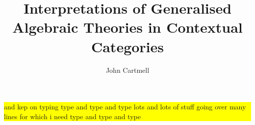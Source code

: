 \documentclass[10pt,a4paper]{article}
\theoremstyle{remark}
\begin{document}
\title{Interpretations of Generalised Algebraic Theories in Contextual Categories}

\author{John Cartmell}

\maketitle

\noindent\colorbox{yellow}{%
    \parbox{\dimexpr\linewidth-2\fboxsep}%
        {%
			and kep on typing 
type and type and type
       lots and lots of stuff going over many lines for which i need type and type and type
        }
    }

\newcommand{\gatU}{\gat[U]}
\newcommand{\gatUw}{\gatU\ }
\newcommand{\CofU}{\ccat[C](\gat[U])}
\newcommand{\KU}{K_{\gat[U]}}
\newcommand{\KUp}{K_{\gat[U']}}
\newcommand{\catCon}{\cat{Con}}
\newcommand{\catGAT}{\cat{GAT}}

\newcommand{\gatrule}[2]{$#1 \tstyle #2$}

\newcommand{\inlinedisplay}[1]
{
\setlength{\fboxsep}{1.5pt}
\setlength{\fboxrule}{0pt}
\fbox{$\displaystyle #1$}
}

\newcommand{\gatdisplayrule}[2]
{
\setlength{\fboxsep}{1pt}
\setlength{\fboxrule}{0pt}
\fbox{$\displaystyle \frac{#1}{#2}$}
}
\newcommand{\Isort}{I_{sort}}
\newcommand{\Iop}{I_{op}}
\newcommand {\Ihat}{\hat{I}}

\renewcommand{\crossx}[3]{#1 \underset{\tiny #3}{\cross} #2}
\newcommand{\fonestar}   {{f_1}\kern-.15em^*}
\newcommand{\ftwostar}   {{f_2}\kern-.15em^*}
\newcommand{\fjstar}     {{f_j}\kern-.2em^*}
\newcommand{\fjpstar}    {{f_{j-1}}\kern-.25em^*}
\newcommand{\smstar}{{s_m}\kern-.25em^*}
\newcommand{\sonestar}{{s_1}\kern-.15em^*}

\newcommand{\Trule} {T-rule\ }
\newcommand{\trule} {$\in$-rule\ }
\newcommand{\Teqrule} {T=-rule\ }
\newcommand{\teqrule} {$\in=$-rule\ }

\newcommand{\genericAintroductoryrule} {\gatdisplayrule{\xDelta{n}}{\isT{A(\xn}}}
\newcommand{\genericfintroductoryrule}  {\gatdisplayrule{\xDelta{n}}{\ofT{f(\xn)}{\Delta}}}

\newcommand{\Imapsto}{\scaleto{\mapsto}{10pt}}

\newcommand{\MAPTO}{&
\refstepcounter{equation}(\theequation) &&
$\mapsto$ &&}

\newcommand{\gatinterpretationdetail}[5]{
\refstepcounter{equation}(\theequation)\label{#1}& \gatrule{#2}{#3}&$\mapsto$&&$#4$&#5}
\end{document}
